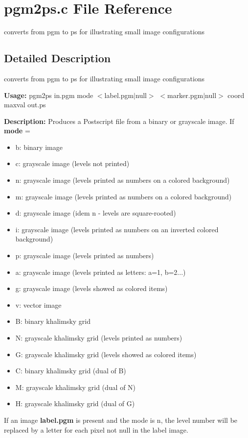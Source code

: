 \section{pgm2ps.c File Reference}
\label{pgm2ps_8c}
converts from pgm to ps for illustrating small image configurations  




\label{_details}
\subsection{Detailed Description}
converts from pgm to ps for illustrating small image configurations 

{\bf Usage:} pgm2ps in.pgm mode $<$label.pgm$|$null$>$ $<$marker.pgm$|$null$>$ coord maxval out.ps

{\bf Description:} Produces a Postscript file from a binary or grayscale image. If {\bf mode} = \begin{itemize}
\item b: binary image \item c: grayscale image (levels not printed) \item n: grayscale image (levels printed as numbers on a colored background) \item m: grayscale image (levels printed as numbers on a colored background) \item d: grayscale image (idem n - levels are square-rooted) \item i: grayscale image (levels printed as numbers on an inverted colored background) \item p: grayscale image (levels printed as numbers) \item a: grayscale image (levels printed as letters: a=1, b=2...) \item g: grayscale image (levels showed as colored items) \item v: vector image \item B: binary khalimsky grid \item N: grayscale khalimsky grid (levels printed as numbers) \item G: grayscale khalimsky grid (levels showed as colored items) \item C: binary khalimsky grid (dual of B) \item M: grayscale khalimsky grid (dual of N) \item H: grayscale khalimsky grid (dual of G)\end{itemize}
If an image {\bf label.pgm} is present and the mode is n, the level number will be replaced by a letter for each pixel not null in the label image.


